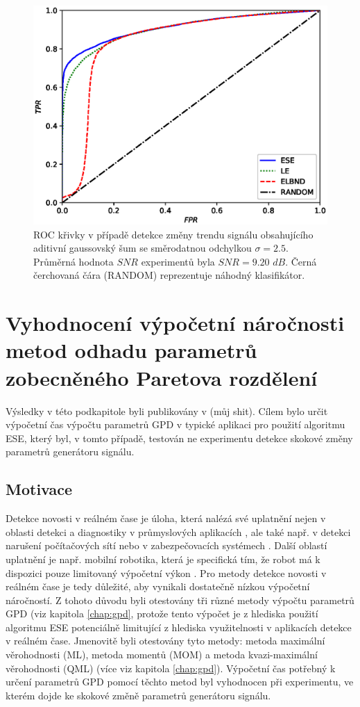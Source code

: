 \begin{figure}[ht!]
    \centering
    \includegraphics[scale=0.73]{IMG/appel_roc/roc_25.eps}
    \caption{ROC křivky v případě detekce změny trendu signálu obsahujícího aditivní gaussovský šum se směrodatnou odchylkou $\sigma=2.5$. Průměrná hodnota $SNR$ experimentů byla $SNR=9.20$ $dB$. Černá čerchovaná čára (RANDOM) reprezentuje náhodný klasifikátor.}
    \label{fig:roc_25}
\end{figure}

\section{Vyhodnocení výpočetní náročnosti metod odhadu parametrů zobecněného Paretova rozdělení}\label{chap:appel_gpd}
Výsledky v této podkapitole byli publikovány v (můj shit). Cílem bylo určit výpočetní čas výpočtu parametrů GPD v typické aplikaci pro použití algoritmu ESE, který byl, v tomto případě, testován ne experimentu detekce skokové změny parametrů generátoru signálu.
\subsection{Motivace}
Detekce novosti v reálném čase je úloha, která nalézá své uplatnění nejen v oblasti detekci a diagnostiky v průmyslových aplikacích \cite{fault}, ale také např. v detekci narušení počítačových sítí \cite{data_streams} nebo v zabezpečovacích systémech \cite{surveilance}. Další oblastí uplatnění je např. mobilní robotika, která je specifická tím, že robot má k dispozici pouze limitovaný výpočetní výkon \cite{robotics_marslan,robotics}. Pro metody detekce novosti v reálném čase je tedy důležité, aby vynikali dostatečně nízkou výpočetní náročností. Z tohoto důvodu byli otestovány tři různé metody výpočtu parametrů GPD (viz kapitola \ref{chap:gpd}, protože tento výpočet je z hlediska použití algoritmu ESE potenciálně limitující z hlediska využitelnosti v aplikacích detekce v reálném čase. Jmenovitě byli otestovány tyto metody: metoda maximální věrohodnosti (ML), metoda momentů (MOM) a metoda kvazi-maximální věrohodnosti (QML) (více viz kapitola \ref{chap:gpd}). Výpočetní čas potřebný k určení parametrů GPD pomocí těchto metod byl vyhodnocen při experimentu, ve kterém dojde ke skokové změně parametrů generátoru signálu.
